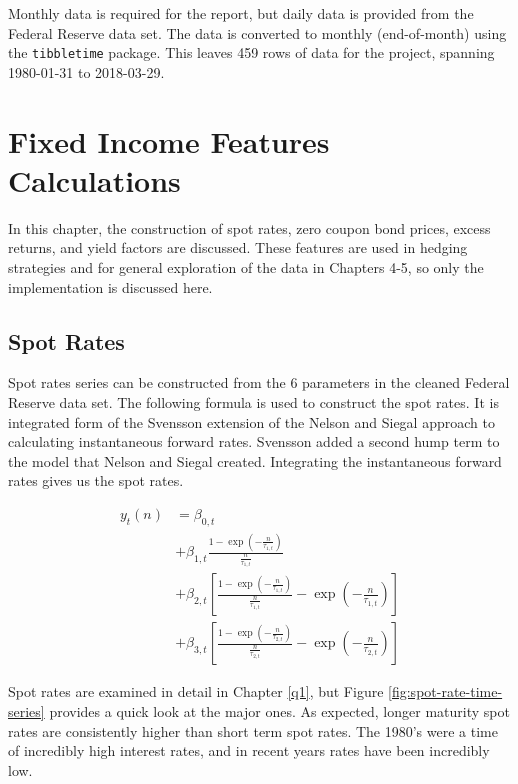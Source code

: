 \documentclass[openany]{book}
\theoremstyle{definition}
\theoremstyle{definition}
\theoremstyle{definition}
\theoremstyle{remark}
\begin{document}
\small

\normalsize

Monthly data is required for the report, but daily data is provided from
the Federal Reserve data set. The data is converted to monthly
(end-of-month) using the \texttt{tibbletime} package. This leaves 459
rows of data for the project, spanning 1980-01-31 to 2018-03-29.

\small

\normalsize

\hypertarget{rates}{%
\chapter{Fixed Income Features Calculations}\label{rates}}

In this chapter, the construction of spot rates, zero coupon bond
prices, excess returns, and yield factors are discussed. These features
are used in hedging strategies and for general exploration of the data
in Chapters 4-5, so only the implementation is discussed here.

\small

\normalsize

\hypertarget{spot-rates}{%
\section{Spot Rates}\label{spot-rates}}

Spot rates series can be constructed from the 6 parameters in the
cleaned Federal Reserve data set. The following formula is used to
construct the spot rates. It is integrated form of the Svensson
extension of the Nelson and Siegal approach to calculating instantaneous
forward rates. Svensson added a second hump term to the model that
Nelson and Siegal created. Integrating the instantaneous forward rates
gives us the spot rates.

\[
\begin{aligned}
  y_t(n) &= \beta_{0,t} \\
   &+ \beta_{1,t} \frac{1 - \exp(- \frac{n}{\tau_{1,t}})}{\frac{n}{\tau_{1,t}}} \\
   &+ \beta_{2,t} [\frac{1 - \exp(- \frac{n}{\tau_{1,t}})}{\frac{n}{\tau_{1,t}}} - \exp(-\frac{n}{\tau_{1,t}})] \\
   &+ \beta_{3,t} [\frac{1 - \exp(- \frac{n}{\tau_{2,t}})}{\frac{n}{\tau_{2,t}}} - \exp(-\frac{n}{\tau_{2,t}})]
\end{aligned}
\]

Spot rates are examined in detail in Chapter \ref{q1}, but Figure
\ref{fig:spot-rate-time-series} provides a quick look at the major ones.
As expected, longer maturity spot rates are consistently higher than
short term spot rates. The 1980's were a time of incredibly high
interest rates, and in recent years rates have been incredibly low.
\end{document}

